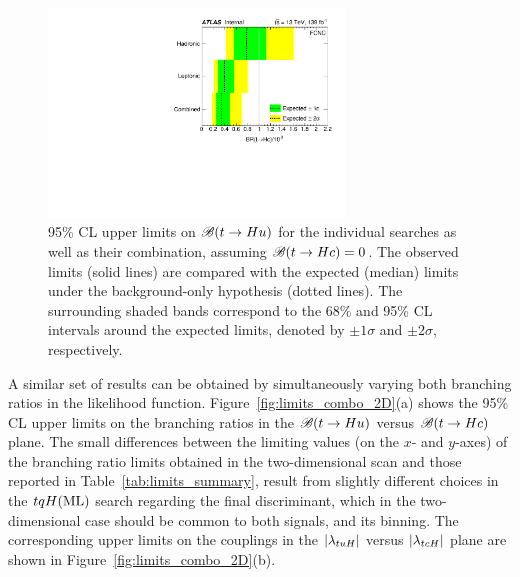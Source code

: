 \begin{figure}[h!]
\begin{center}
\includegraphics[width=0.7\textwidth]{figures/tuH_combined_Limit.pdf}
\caption{\small {95\% CL upper limits on $\mathscr{B}(t\to Hu)$ for the individual searches as well as their
combination, assuming $\mathscr{B}(t\to Hc)=0$. The observed limits (solid lines) are compared with the 
expected (median) limits under the background-only
hypothesis (dotted lines). The surrounding shaded bands correspond to the 68\% and 95\% CL intervals around the expected limits, 
denoted by $\pm 1\sigma$ and $\pm 2\sigma$, respectively.
}}
\label{fig:limits_combo_1D_hu} 
\end{center}
\end{figure}

A similar set of results can be obtained by simultaneously varying both branching ratios in the likelihood function.
Figure~\ref{fig:limits_combo_2D}(a) shows the 95\% CL upper limits on the branching ratios in the $\mathscr{B}(t\to Hu)$ versus $\mathscr{B}(t\to Hc)$ plane. 
The small differences between the limiting values (on the $x$- and $y$-axes) of the branching ratio limits obtained in the two-dimensional scan and 
those reported in Table~\ref{tab:limits_summary}, result from slightly different choices in the $tqH(\mathrm{ML})$ search  
regarding the final discriminant, which in the two-dimensional case should be common to both signals, and its binning.
The corresponding upper limits on the couplings in the $|\lambda_{tuH}|$ versus $|\lambda_{tcH}|$ plane are shown in Figure~\ref{fig:limits_combo_2D}(b).

